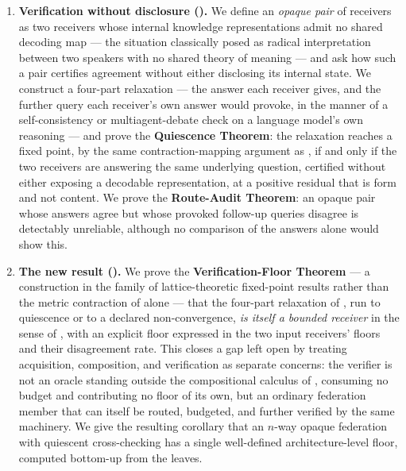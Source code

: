 \documentclass[11pt,twocolumn,a4paper]{article}
\theoremstyle{rdm}
\theoremstyle{definition}
\theoremstyle{remark}
\begin{document}
\begin{enumerate}[leftmargin=*,itemsep=2pt]
\item \textbf{Verification without disclosure ().} We
define an \emph{opaque pair} of receivers as two receivers whose internal
knowledge representations admit no shared decoding map --- the situation
classically posed as radical interpretation between two speakers with no
shared theory of meaning \citep{quine1960,davidson1973,grice1975} --- and ask
how such a pair certifies agreement without either disclosing its internal
state. We construct a four-part relaxation --- the answer each receiver
gives, and the further query each receiver's own answer would provoke, in
the manner of a self-consistency or multiagent-debate check on a language
model's own reasoning \citep{wang2022selfconsistency,duimproving2023,
wei2022chain,madaan2023selfrefine,zheng2023judging} --- and prove the
\textbf{Quiescence Theorem}: the relaxation reaches a fixed point, by the
same contraction-mapping argument as \citet{banach1922}, if and only
if the two receivers are answering the same underlying question, certified
without either exposing a decodable representation, at a positive residual
that is form and not content. We prove the \textbf{Route-Audit Theorem}: an
opaque pair whose answers agree but whose provoked follow-up queries disagree
is detectably unreliable, although no comparison of the answers alone would
show this.

\item \textbf{The new result ().} We prove the
\textbf{Verification-Floor Theorem} --- a construction in the family of
lattice-theoretic fixed-point results \citep{tarski1955} rather than the
metric contraction of  alone --- that the four-part
relaxation of , run to quiescence or to a declared
non-convergence, \emph{is itself a bounded receiver} in the sense of
, with
an explicit floor expressed in the two input receivers' floors and their
disagreement rate. This closes a gap left open by treating acquisition,
composition, and verification as separate concerns: the verifier is not an
oracle standing outside the compositional calculus of ,
consuming no budget and contributing no floor of its own, but an ordinary
federation member that can itself be routed, budgeted, and further verified
by the same machinery. We give the resulting corollary that an $n$-way
opaque federation with quiescent cross-checking has a single well-defined
architecture-level floor, computed bottom-up from the leaves.
\end{enumerate}
\end{document}
